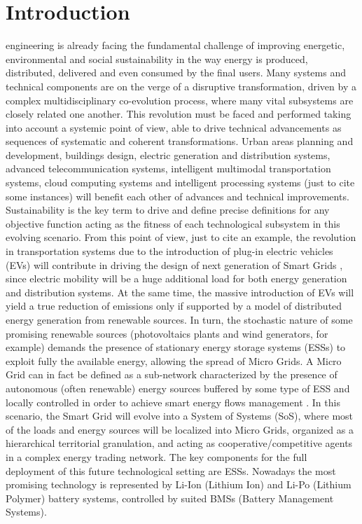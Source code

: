 \documentclass[journal]{IEEEtran}
\begin{document}
\section{Introduction}
\label{sec:intro}
 engineering is already facing the fundamental challenge of improving energetic, environmental and social sustainability in the way energy is produced, distributed, delivered and even consumed by the final users. Many systems and technical components are on the verge of a disruptive transformation, driven by a complex multidisciplinary co-evolution process, where many vital subsystems are closely related one another. This revolution must be faced and performed taking into account a systemic point of view, able to drive technical advancements as sequences of systematic and coherent transformations. Urban areas planning and development, buildings design, electric generation and distribution systems, advanced telecommunication systems, intelligent multimodal transportation systems, cloud computing systems and intelligent processing systems  (just to cite some instances) will benefit each other of advances and technical improvements. Sustainability is the key term to drive and define precise definitions for any objective function acting as the fitness of each technological subsystem in this evolving scenario. 
From this point of view, just to cite an example, the revolution in transportation systems due to the introduction of plug-in electric vehicles (EVs) will contribute in driving the design of next generation of Smart Grids \cite{Yu_2011,deSantis_2015,Storti_2015}, since electric mobility will be a huge additional load for both energy generation and distribution systems. At the same time, the massive introduction of EVs will yield a true reduction of  emissions only if supported by a model of distributed energy generation from renewable sources. In turn, the stochastic nature of some promising renewable sources (photovoltaics plants and wind generators, for example) demands the presence of stationary energy storage systems (ESSs) to exploit fully the available energy, allowing the spread of Micro Grids. A Micro Grid can in fact be defined as a sub-network characterized by the presence of autonomous (often renewable) energy sources buffered by some type of ESS and locally controlled in order to achieve smart energy flows management \cite{deSantis_2013}. In this scenario, the Smart Grid will evolve into a System of Systems (SoS), where most of the loads and energy sources will be localized into Micro Grids, organized as a hierarchical territorial granulation, and acting as cooperative/competitive agents in a complex energy trading network. The key components for the full deployment of this future technological setting are ESSs. Nowadays the most promising technology is represented by Li-Ion (Lithium Ion) and Li-Po (Lithium Polymer) battery systems, controlled by suited BMSs (Battery Management Systems).
\end{document}
